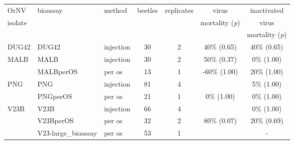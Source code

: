 \documentclass[12pt,letterpaper,english,bibliography=totocnumbered]{scrartcl}
\begin{document}
\begin{refsection}
\begin{table}[h]
\begin{adjustbox}{width=\columnwidth,center}
\begin{threeparttable}
			
	\begin{tabular}{ l l l c c c c }
		\toprule
		OrNV                  & bioassay                                        & method\tnote{1} & beetles & replicates & virus                           & inactivated                     \\
		isolate               &                                                 &                 &         &            & mortality (\textit{p})\tnote{2} & virus                           \\
		                      &                                                 &                 &         &            &                                 & mortality (\textit{p})\tnote{3} \\ \bottomrule
		DUG42                 & DUG42\cite{moore_bioassay_2019}                 & injection       & 30      & 2          & 40\% (0.65)                     & 40\% (0.65)                     \\ \midrule
		\multirow{2}{*}{MALB} & MALB\cite{moore_bioassay_2019-6}                & injection       & 30      & 2          & 50\% (0.37)                     & \hphantom{0}0\% (1.00)          \\
		                      & MALBperOS\cite{moore_bioassay_2019-7}           & per os          & 13      & 1          & -60\% (1.00)                    & 20\% (1.00)                     \\ \midrule
		\multirow{2}{*}{PNG}  & PNG\cite{moore_bioassay_2019-2}                 & injection       & 81      & 4          & \cellcolor{yellow}{90\% (0.00)} & \hphantom{0}5\% (1.00)          \\
		                      & PNGperOS\cite{moore_bioassay_2019-9}            & per os          & 21      & 1          & \hphantom{0}0\% (1.00)          & \hphantom{0} 0\% (1.00)         \\ \midrule
		\multirow{4}{*}{V23B} & V23B\cite{moore_bioassay_2019-3}                & injection       & 66      & 4          & \cellcolor{yellow}{88\% (0.00)} & \hphantom{0}0\% (1.00)          \\
		                      & V23BperOS\cite{moore_bioassay_2019-5}           & per os          & 32      & 2          & 80\% (0.07)                     & 20\% (0.69)                     \\
		                      & V23-large\_bioassay\cite{moore_bioassay_2019-4} & per os          & 53      & 1          & \cellcolor{yellow}{42\% (0.00)} & -                               \\

\end{tabular}
\end{threeparttable}
\end{adjustbox}
\end{table}
\end{refsection}
\end{document}
